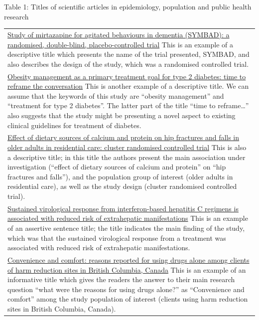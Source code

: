 \documentclass[
]{book}
\begin{document}
Table 1: Titles of scientific articles in epidemiology, population and public health research

\begin{longtable}[]{@{}
  >{\raggedright\arraybackslash}p{}@{}}
\toprule
\endhead
\href{https://www.thelancet.com/journals/lancet/article/PIIS0140-6736(21)01210-1/fulltext}{Study of mirtazapine for agitated behaviours in dementia (SYMBAD): a randomised, double-blind, placebo-controlled trial} This is an example of a descriptive title which presents the name of the trial presented, SYMBAD, and also describes the design of the study, which was a randomised controlled trial. \\
\href{https://www.thelancet.com/journals/lancet/article/PIIS0140-6736(21)01919-X/fulltext}{Obesity management as a primary treatment goal for type 2 diabetes: time to reframe the conversation} This is another example of a descriptive title. We can assume that the keywords of this study are ``obesity management'' and ``treatment for type 2 diabetes''. The latter part of the title ``time to reframe\ldots{}'' also suggests that the study might be presenting a novel aspect to existing clinical guidelines for treatment of diabetes. \\
\href{https://www.bmj.com/content/375/bmj.n2364}{Effect of dietary sources of calcium and protein on hip fractures and falls in older adults in residential care: cluster randomised controlled trial} This is also a descriptive title; in this title the authors present the main association under investigation (``effect of dietary sources of calcium and protein'' on ``hip fractures and falls''), and the population group of interest (older adults in residential care), as well as the study design (cluster randomised controlled trial). \\
\href{https://www.sciencedirect.com/science/article/abs/pii/S0168827819304623}{Sustained virological response from interferon-based hepatitis C regimens is associated with reduced risk of extrahepatic manifestations} This is an example of an assertive sentence title; the title indicates the main finding of the study, which was that the sustained virological response from a treatment was associated with reduced risk of extrahepatic manifestations. \\
\href{https://link.springer.com/article/10.1186/s12954-020-00436-6}{Convenience and comfort: reasons reported for using drugs alone among clients of harm reduction sites in British Columbia, Canada} This is an example of an informative title which gives the readers the answer to their main research question ``what were the reasons for using drugs alone?'' as ``Convenience and comfort'' among the study population of interest (clients using harm reduction sites in British Columbia, Canada). \\

\end{longtable}
\end{document}

